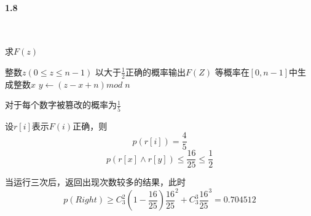 \paragraph{1.8}~{}

\begin{algorithm}[H]  
    \caption{求$F(z)$}  
    \begin{algorithmic}[1]
        \Require 整数$z(0 \le z \le n-1)$
        \Ensure 以大于$\frac{1}{2}$正确的概率输出$F(Z)$
        \State 等概率在$[0,n-1]$中生成整数$x$
        \State $y \leftarrow (z-x+n)mod \; n$
    \end{algorithmic}
\end{algorithm}

对于每个数字被篡改的概率为$\frac{1}{5}$

设$r[i]$表示$F(i)$正确，则
$$p(r[i])=\frac{4}{5}$$
$$p(r[x] \land r[y]) \le \frac{16}{25} \le \frac{1}{2}$$

当运行三次后，返回出现次数较多的结果，此时
$$p(Right) \ge C_3^2(1-\frac{16}{25})\frac{16}{25}^2+C_3^3\frac{16}{25}^3=0.704512$$